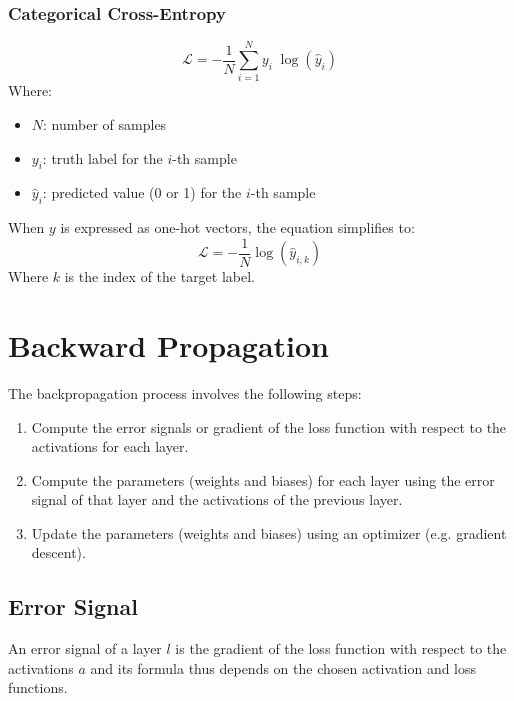 \documentclass[a4paper]{article}
\newcommand{\haty}{\hat{y}}
\newcommand{\ELL}{\mathcal{L}}
\begin{document}
\subsubsection*{Categorical Cross-Entropy}
\begin{equation*}
    \ELL = -\frac{1}{N} \sum_{i=1}^{N} y_i \; \log(\haty_i)
\end{equation*}
Where:
\begin{itemize}
    \item $N$: number of samples
    \item $y_i$: truth label for the $i$-th sample
    \item $\haty_i$: predicted value (0 or 1) for the $i$-th sample
\end{itemize}
When $y$ is expressed as one-hot vectors, the equation simplifies to:
\begin{equation*}
    \ELL = -\frac{1}{N} \log(\haty_{i,k})
\end{equation*}
Where $k$ is the index of the target label.

\newpage
\section*{Backward Propagation}
The backpropagation process involves the following steps:
\begin{enumerate}
    \item Compute the error signals or gradient of the loss function with respect to the activations for each layer.
    \item Compute the parameters (weights and biases) for each layer using the error signal of that layer and the activations of the previous layer.
    \item Update the parameters (weights and biases) using an optimizer (e.g. gradient descent).
\end{enumerate}

\subsection*{Error Signal}
An error signal of a layer $l$ is the gradient of the loss function with respect to the activations $a$ and its formula thus depends on the chosen activation and loss functions.
    
\end{document}
